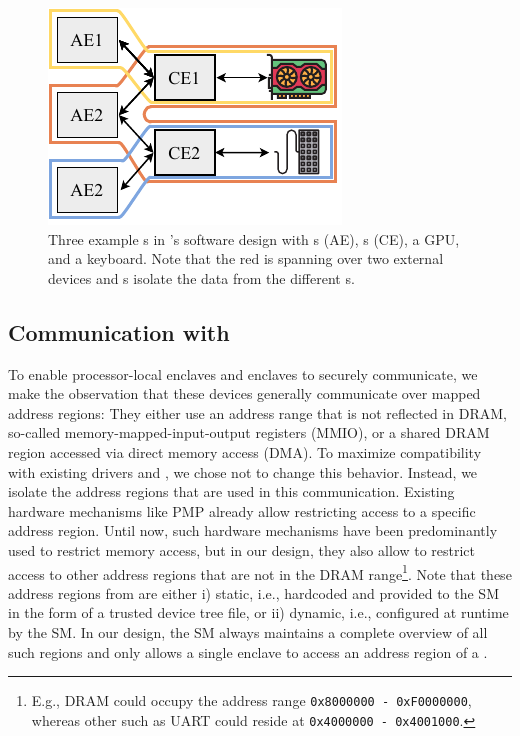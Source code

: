 \begin{figure}[tbp]
     \centering
     \includegraphics[width=0.4\linewidth]{chapters/PIE/images/softwaredesign.pdf}
     
     \caption[Three example \nameenclave{}s in \name{}'s software design]{Three example \nameenclave{}s in \name{}'s software design with \app{}s (AE), \ce{}s (CE), a GPU, and a keyboard. Note that the red \nameenclave{} is spanning over two external devices and \ce{}s isolate the data from the different \app{}s.}
     \label{fig:sharedMemory}
\end{figure}

\subsection{Communication with \sphw}
\label{sec:approach:comm}

To enable processor-local enclaves and \sphw enclaves to securely communicate, we make the observation that these devices generally communicate over mapped address regions: They either use an address range that is not reflected in DRAM, so-called memory-mapped-input-output registers (MMIO), or a shared DRAM region accessed via direct memory access (DMA). To maximize compatibility with existing drivers and \sphw, we chose not to change this behavior. Instead, we isolate the address regions that are used in this communication. Existing hardware mechanisms like PMP already allow restricting access to a specific address region. Until now, such hardware mechanisms have been predominantly used to restrict memory access, but in our design, they also allow to restrict access to other address regions that are not in the DRAM range\footnote{E.g., DRAM could occupy the address range \texttt{0x8000000 - 0xF0000000}, whereas other \sphw such as UART could reside at \texttt{0x4000000 - 0x4001000}.}. Note that these address regions from \sphw are either i) static, i.e., hardcoded and provided to the SM in the form of a trusted device tree file, or ii) dynamic, i.e., configured at runtime by the SM. In our design, the SM always maintains a complete overview of all such regions and only allows a single enclave to access an address region of a \sphw.


